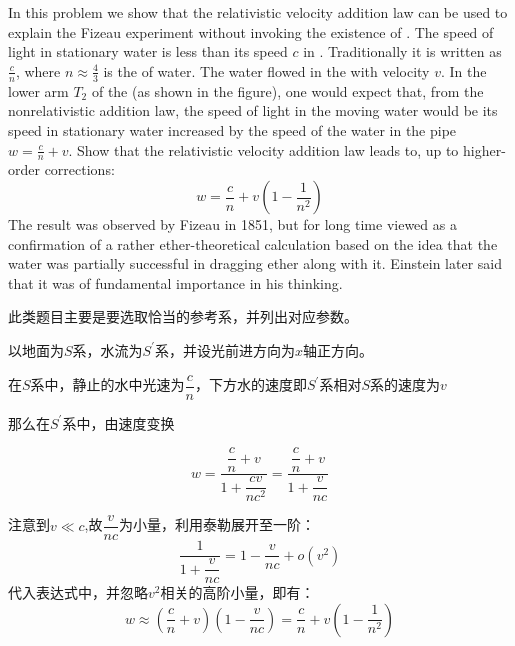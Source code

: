 \chapter[狭义相对论]{}
\begin{solution}
	In this problem we show that the relativistic velocity addition law can be used to
	explain the Fizeau experiment without invoking the existence of . The speed of light in stationary water is less than its speed $c$ in .
	Traditionally it is written as $\frac{c}{n}$, where $n\approx \frac{4}{3}$ is the  of water. The water flowed in the  with
	velocity $v$. In the lower arm $T_2$ of the  (as shown in the figure), one would expect that, from the nonrelativistic addition law, the
	speed of light in the moving water would be its speed in stationary
	water increased by the speed of the water in the pipe $w=\frac{c}{n}+v$. Show
	that the relativistic velocity addition law leads to, up to higher-order
	corrections:
	\begin{equation*}
		w=\frac cn+v\left(1-\frac1{n^2}\right)
	\end{equation*}
	The result was observed by Fizeau in 1851, but for long time viewed as
	a confirmation of a rather   ether-theoretical
	calculation based on the idea that the water was partially successful in
	dragging ether along with it. Einstein later said that it was of
	fundamental importance in his thinking.
      \begin{center}
      \end{center}
      
      \tcbrule
      
      此类题目主要是要选取恰当的参考系，并列出对应参数。
      
      以地面为$S$系，水流为$S^{\prime}$系，并设光前进方向为$x$轴正方向。
      
      在$S$系中，静止的水中光速为$\dfrac{c}{n}$，下方水的速度即$S^{\prime}$系相对$S$系的速度为$v$
      
      那么在$S^{\prime}$系中，由速度变换
      
      \[w=\dfrac{\dfrac{c}{n}+v}{1+\dfrac{cv}{nc^{2}}}=\dfrac{\dfrac{c}{n}+v}{1+\dfrac{v}{nc}}\]
      
      注意到$v\ll c$,故$\dfrac{v}{nc}$为小量，利用泰勒展开至一阶：
      \begin{equation*}
      	\dfrac{1}{1+\dfrac{v}{nc}} = 1 - \dfrac{v}{nc} + o\left(v^{2}\right) 
      \end{equation*}
      代入表达式中，并忽略$v^{2}$相关的高阶小量，即有：
      \[w\approx(\frac{c}{n}+v)(1-\frac{v}{nc})=\frac{c}{n}+v(1-\frac{1}{n^{2}})\]
\end{solution}
